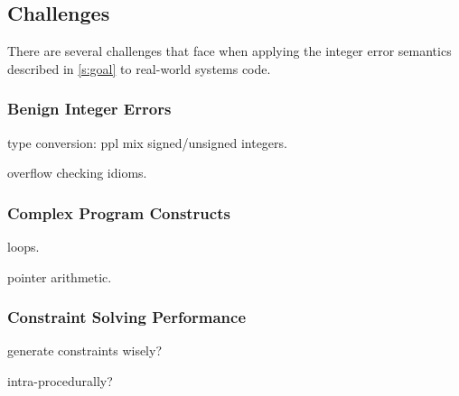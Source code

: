 \subsection{Challenges}
\label{s:chal}

There are several challenges that face \sys when applying the
integer error semantics described in \autoref{s:goal} to real-world
systems code.

\subsubsection*{Benign Integer Errors}

type conversion: ppl mix signed/unsigned integers.

overflow checking idioms.

\subsubsection*{Complex Program Constructs}

loops.

pointer arithmetic.

\subsubsection*{Constraint Solving Performance}

generate constraints wisely?

intra-procedurally?

